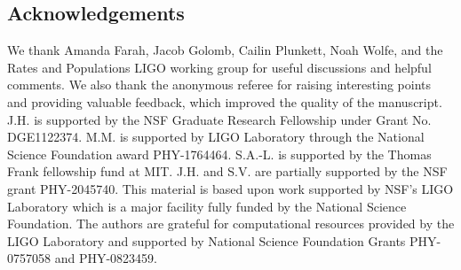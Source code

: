 \begin{refsection}
\section*{Acknowledgements}

We thank Amanda Farah, Jacob Golomb, Cailin Plunkett, Noah Wolfe, and the Rates and Populations LIGO working group for useful discussions and helpful comments.
%
We also thank the anonymous referee for raising interesting points and providing valuable feedback, which improved the quality of the manuscript.
%
J.H. is supported by the NSF Graduate Research Fellowship under Grant No. DGE1122374.
%
M.M. is supported by LIGO Laboratory through the National Science Foundation award PHY-1764464.
%
S.A.-L. is supported by the Thomas Frank fellowship fund at MIT.
%
J.H. and S.V. are partially supported by the NSF grant PHY-2045740.
%
This material is based upon work supported by NSF's LIGO Laboratory which is a major facility fully funded by the National Science Foundation.
%
The authors are grateful for computational resources provided by the LIGO Laboratory and supported by National Science Foundation Grants PHY-0757058 and PHY-0823459.


\printbibliography[heading=subbibliography]
\end{refsection}

